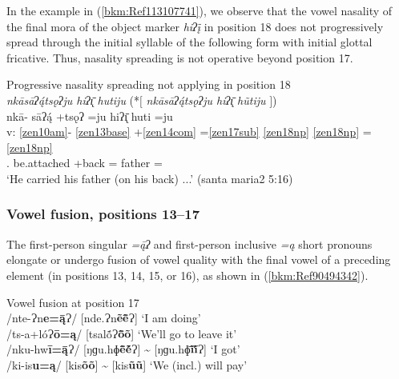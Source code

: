 \documentclass[output=paper]{langscibook}
\begin{document}
In the example in (\ref{bkm:Ref113107741}), we observe that the vowel nasality of the final mora of the object marker \textit{hiʔį̄} in position 18 does not progressively spread through the initial syllable of the following form with initial glottal fricative. Thus, nasality spreading is not operative beyond position 17.


\ea\label{bkm:Ref113107741}Progressive nasality spreading not applying in position 18 \\
\textit{nkāsāʔ\'{ą}tsǫʔju hiʔ\={\k{ı}} hutiju } (*$[$ \textit{nkāsāʔ\'{ą}tsǫʔju hiʔ\={\k{ı}}  hũtiju} $]$) \\ 
    \glll {} nkā- sāʔ\'{ą} +tsǫʔ =ju hiʔ\={\k{ı}} huti =ju \\
    v: \ref{zen10am}{}- \ref{zen13base} +\ref{zen14com} =\ref{zen17sub} \ref{zen18np} \ref{zen18np} =\ref{zen18np} \\ 
{} \Pfv.\Caus{} be.attached +back =\Third\Sg\M{} \Obj{} father =\Third\Sg\M{} \\
    \glt `He carried his father (on his back) ...' (santa maria2 5:16)  
\z

\subsubsection{Vowel fusion, positions 13{}--17} 
\label{bkm:Ref98189638}
The first-person singular \textit{=ą̄ʔ} and first-person inclusive \textit{=ą} short pronouns elongate or undergo fusion of vowel quality with the final vowel of a preceding element (in positions 13, 14, 15, or 16), as shown in (\ref{bkm:Ref90494342}). 


\ea\label{bkm:Ref90494342}Vowel fusion at position 17\\ 
/nte-Ɂn\textbf{e=ą̄}Ɂ/\hspace{0.53cm} [nde.Ɂn\textbf{\~e\={\~e}}Ɂ] 
\hspace{2.75cm} `I am doing'\\
/ts-a+lóɁ\textbf{ō=ą}/\hspace{0.44cm}  [tsal\'{\~{o}}Ɂ\textbf{\={õ}õ}] \hspace{3cm} `We'll go to leave it'\\
/nku-hw\textbf{ī=ą̄}Ɂ/\hspace{0.39cm}  [ŋɡu.hɸ\textbf{\={\~{e}}\'{\~{e}}}Ɂ]  {\textasciitilde}  [ŋɡu.hɸ\textbf{\={\~{i}}\'{\~{i}}}Ɂ] 
\hspace{0.6cm}`I got'\\
/ki-is\textbf{u=ą}/\hspace{1cm}  [kis\textbf{õõ}]  {\textasciitilde}  [kis\textbf{ũũ}] 
\hspace{1.92cm} `We (incl.) will pay'\\
\z 
\end{document}
